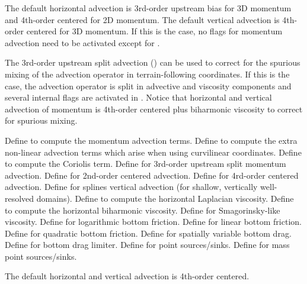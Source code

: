 \begin{klist}
    \mbox{}
The default horizontal advection is 3rd-order upstream bias for
3D momentum and 4th-order centered for 2D momentum. The default
vertical advection is 4th-order centered for 3D momentum. If this
is the case, no flags for momentum advection need to be activated except
for .

The 3rd-order upstream split advection () can be used
to correct for the spurious mixing of the advection operator in
terrain-following coordinates. If this is the case, the advection
operator is split in advective and viscosity components and several
internal flags are activated in .  Notice that
horizontal and vertical advection of momentum is 4th-order centered
plus biharmonic viscosity to correct for spurious mixing.
  \begin{klist}
         Define to compute the momentum advection terms.
        Define to compute the extra
  non-linear advection terms which arise when using curvilinear coordinates.
         Define to compute the Coriolis term.
     Define for 3rd-order upstream split
  momentum advection.
     Define for 2nd-order centered advection.
     Define for 4rd-order centered advection.
     Define for splines vertical advection
    (for shallow, vertically well-resolved domains).
        Define to compute the
  horizontal Laplacian viscosity.
        Define to compute the
  horizontal biharmonic viscosity.
     Define for Smagorinsky-like viscosity.
     Define for logarithmic bottom friction.
       Define for linear bottom friction.
       Define for quadratic bottom friction.
      Define for spatially variable bottom drag.
      Define for bottom drag limiter.
     Define for point sources/sinks.
      Define for mass point sources/sinks.
  \end{klist}
   \mbox{}
The default horizontal and vertical advection is 4th-order centered.


\end{klist}
